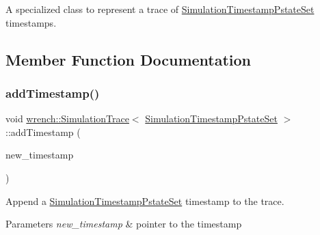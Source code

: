 A specialized class to represent a trace of \hyperlink{classwrench_1_1_simulation_timestamp_pstate_set}{Simulation\+Timestamp\+Pstate\+Set} timestamps. 

\subsection{Member Function Documentation}
\mbox{\label{classwrench_1_1_simulation_trace_3_01_simulation_timestamp_pstate_set_01_4_a1f835fad40b9f45bf25111a1636e86b7}} 
\subsubsection{\texorpdfstring{add\+Timestamp()}{addTimestamp()}}
{\footnotesize\ttfamily void \hyperlink{classwrench_1_1_simulation_trace}{wrench\+::\+Simulation\+Trace}$<$ \hyperlink{classwrench_1_1_simulation_timestamp_pstate_set}{Simulation\+Timestamp\+Pstate\+Set} $>$\+::add\+Timestamp (\begin{DoxyParamCaption}\item[{\hyperlink{classwrench_1_1_simulation_timestamp}{Simulation\+Timestamp}$<$ \hyperlink{classwrench_1_1_simulation_timestamp_pstate_set}{Simulation\+Timestamp\+Pstate\+Set} $>$ $\ast$}]{new\+\_\+timestamp }\end{DoxyParamCaption})\hspace{0.3cm}{\ttfamily [inline]}}



Append a \hyperlink{classwrench_1_1_simulation_timestamp_pstate_set}{Simulation\+Timestamp\+Pstate\+Set} timestamp to the trace. 


\begin{DoxyParams}{Parameters}
{\em new\+\_\+timestamp} & pointer to the timestamp \\
\hline
\end{DoxyParams}
\mbox{\label{classwrench_1_1_simulation_trace_3_01_simulation_timestamp_pstate_set_01_4_a779e26ba2ab24051e8caf8371b6b2cc6}} 
